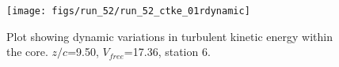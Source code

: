 \begin{figure}[H]
\centering
\texttt{[image: figs/run\_52/run\_52\_ctke\_01rdynamic]}
\caption{Plot showing dynamic variations in turbulent kinetic energy within the core. $z/c$=9.50, $V_{free}$=17.36, station 6.}
\label{fig:run_52_ctke_01rdynamic}
\end{figure}


